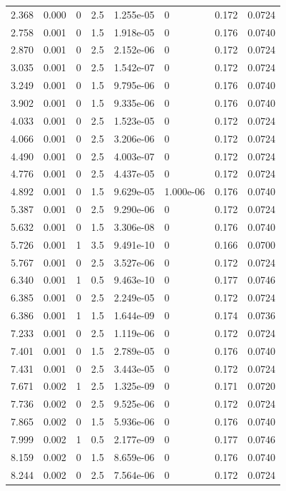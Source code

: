 \documentclass[preview]{standalone}
\begin{document}
{{\begin{tabular}{L{1.2cm}C{1.2cm} C{0.3cm}C{0.5cm} C{1.4cm}C{1.4cm} C{1.4cm}C{1.4cm}}
  2.368  &  0.000  & 0     & 2.5 &  1.255e-05  & 0  & 0.172 &  0.0724   \\ 
  2.758  &  0.001  & 0     & 1.5 &  1.918e-05  & 0  & 0.176 &  0.0740   \\ 
  2.870  &  0.001  & 0     & 2.5 &  2.152e-06  & 0  & 0.172 &  0.0724   \\ 
  3.035  &  0.001  & 0     & 2.5 &  1.542e-07  & 0  & 0.172 &  0.0724   \\ 
  3.249  &  0.001  & 0     & 1.5 &  9.795e-06  & 0  & 0.176 &  0.0740   \\ 
  3.902  &  0.001  & 0     & 1.5 &  9.335e-06  & 0  & 0.176 &  0.0740   \\ 
  4.033  &  0.001  & 0     & 2.5 &  1.523e-05  & 0  & 0.172 &  0.0724   \\ 
  4.066  &  0.001  & 0     & 2.5 &  3.206e-06  & 0  & 0.172 &  0.0724   \\ 
  4.490  &  0.001  & 0     & 2.5 &  4.003e-07  & 0  & 0.172 &  0.0724   \\ 
  4.776  &  0.001  & 0     & 2.5 &  4.437e-05  & 0  & 0.172 &  0.0724   \\ 
  4.892  &  0.001  & 0     & 1.5 &  9.629e-05  & 1.000e-06  & 0.176 &  0.0740   \\ 
  5.387  &  0.001  & 0     & 2.5 &  9.290e-06  & 0  & 0.172 &  0.0724   \\ 
  5.632  &  0.001  & 0     & 1.5 &  3.306e-08  & 0  & 0.176 &  0.0740   \\ 
  5.726  &  0.001  & 1     & 3.5 &  9.491e-10  & 0  & 0.166 &  0.0700   \\ 
  5.767  &  0.001  & 0     & 2.5 &  3.527e-06  & 0  & 0.172 &  0.0724   \\ 
  6.340  &  0.001  & 1     & 0.5 &  9.463e-10  & 0  & 0.177 &  0.0746   \\ 
  6.385  &  0.001  & 0     & 2.5 &  2.249e-05  & 0  & 0.172 &  0.0724   \\ 
  6.386  &  0.001  & 1     & 1.5 &  1.644e-09  & 0  & 0.174 &  0.0736   \\ 
  7.233  &  0.001  & 0     & 2.5 &  1.119e-06  & 0  & 0.172 &  0.0724   \\ 
  7.401  &  0.001  & 0     & 1.5 &  2.789e-05  & 0  & 0.176 &  0.0740   \\ 
  7.431  &  0.001  & 0     & 2.5 &  3.443e-05  & 0  & 0.172 &  0.0724   \\ 
  7.671  &  0.002  & 1     & 2.5 &  1.325e-09  & 0  & 0.171 &  0.0720   \\ 
  7.736  &  0.002  & 0     & 2.5 &  9.525e-06  & 0  & 0.172 &  0.0724   \\ 
  7.865  &  0.002  & 0     & 1.5 &  5.936e-06  & 0  & 0.176 &  0.0740   \\ 
  7.999  &  0.002  & 1     & 0.5 &  2.177e-09  & 0  & 0.177 &  0.0746   \\ 
  8.159  &  0.002  & 0     & 1.5 &  8.659e-06  & 0  & 0.176 &  0.0740   \\ 
  8.244  &  0.002  & 0     & 2.5 &  7.564e-06  & 0  & 0.172 &  0.0724   \\ 
\hline 
\end{tabular} 

}}
\end{document}
